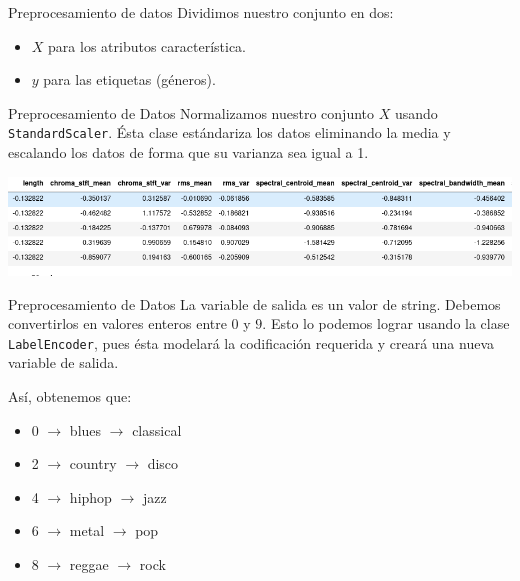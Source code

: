 \documentclass[11pt]{beamer}
\begin{document}
\begin{frame}{Preprocesamiento de datos}
    Dividimos nuestro conjunto en dos: 
    \begin{itemize}
        \item $X$ para los atributos característica.

        \item $y$ para las etiquetas (géneros).
    \end{itemize}
    \lstI
\end{frame}

\begin{frame}{Preprocesamiento de Datos}
    Normalizamos nuestro conjunto $X$ usando \texttt{StandardScaler}. Ésta 
    clase estándariza los datos eliminando la media y escalando los datos 
    de forma que su varianza sea igual a 1.
    \begin{center}
        \includegraphics[width=1\textwidth]{imagenes/X.png}
    \end{center}
\end{frame}

\begin{frame}{Preprocesamiento de Datos}
    La variable de salida es un valor de string. Debemos convertirlos en 
    valores enteros entre $0$ y $9$. Esto lo podemos lograr usando la 
    clase \texttt{LabelEncoder}, pues ésta modelará la codificación 
    requerida y creará una nueva variable de salida.

    Así, obtenemos que:
    \begin{itemize}
        \item 0 $\rightarrow$ blues \quad \quad {} $\rightarrow$ classical
        \item 2 $\rightarrow$ country \quad {} $\rightarrow$ disco
        \item 4 $\rightarrow$ hiphop \quad {} $\rightarrow$ jazz
        \item 6 $\rightarrow$ metal \quad \quad {} $\rightarrow$ pop
        \item 8 $\rightarrow$ reggae \quad {} $\rightarrow$ rock
    \end{itemize}
\end{frame}
\end{document}
